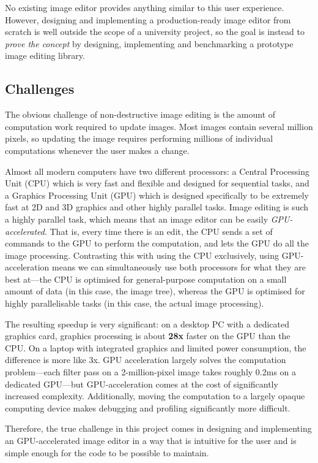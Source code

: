 \documentclass[12pt]{article}
\begin{document}
No existing image editor provides anything similar to this user experience.  However, designing and
implementing a production-ready image editor from scratch is well outside the scope of a university
project, so the goal is instead to \emph{prove the concept} by designing, implementing and
benchmarking a prototype image editing library.

\subsection{Challenges}

The obvious challenge of non-destructive image editing is the amount of computation work
required to update images.  Most images contain several million pixels, so updating the image
requires performing millions of individual computations whenever the user makes a change.  

Almost all modern computers have two different processors: a Central Processing Unit (CPU) which is
very fast and flexible and designed for sequential tasks, and a Graphics Processing Unit (GPU) which
is designed specifically to be extremely fast at 2D and 3D graphics and other highly parallel tasks.
Image editing is such a highly parallel task, which means that an image editor can be easily
\emph{GPU-accelerated}.  That is, every time there is an edit, the CPU sends a set of commands to
the GPU to perform the computation, and lets the GPU do all the image processing.  Contrasting this
with using the CPU exclusively, using GPU-acceleration means we can simultaneously use both
processors for what they are best at---the CPU is optimised for general-purpose computation on a
small amount of data (in this case, the image tree), whereas the GPU is optimised for highly
parallelisable tasks (in this case, the actual image processing).

The resulting speedup is very significant: on a desktop PC with a dedicated graphics card, graphics
processing is about \textbf{28x} faster on the GPU than the CPU.  On a laptop with integrated
graphics and limited power consumption, the difference is more like 3x.  GPU acceleration largely
solves the computation problem---each filter pass on a 2-million-pixel image takes roughly 0.2ms on
a dedicated GPU---but GPU-acceleration comes at the cost of significantly increased complexity.
Additionally, moving the computation to a largely opaque computing device makes debugging and
profiling significantly more difficult.

Therefore, the true challenge in this project comes in designing and implementing an GPU-accelerated
image editor in a way that is intuitive for the user and is simple enough for the code to be
possible to maintain.
\end{document}
